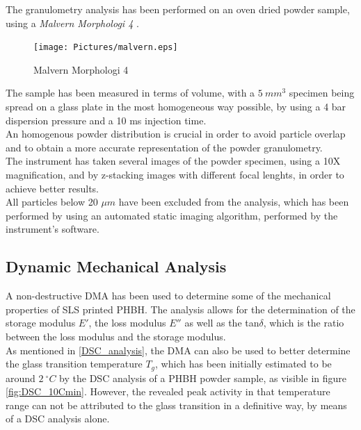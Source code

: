 \documentclass{article}
\begin{document}
        The granulometry analysis has been performed on an oven dried powder sample, 
        using a \textit{Malvern Morphologi 4} \autocites{Malvern_Morphologi4}. \\ 

        \begin{figure}[h!]
            \centering
            \texttt{[image: Pictures/malvern.eps]}
            \caption{Malvern Morphologi 4 \autocites{Malvern_Morphologi4}}
            \label{fig:morphologi4}
        \end{figure}

        The sample has been measured in terms of volume, with a $5 \ mm^3$ specimen being spread on a glass plate in the 
        most homogeneous way possible, by using a 4 bar dispersion pressure and a 10 ms injection time. \\ 

        An homogenous powder distribution is crucial in order to avoid particle overlap and to obtain a more accurate 
        representation of the powder granulometry. \\ 

        The instrument has taken several images of the powder specimen, using a 10X magnification, and by z-stacking 
        images with different focal lenghts, in order to achieve better results. \\

        All particles below 20 $\mu m$ have been excluded from the analysis, which has been performed by using an automated 
        static imaging algorithm, performed by the instrument's software. \\ 

      \clearpage

      \subsection{Dynamic Mechanical Analysis\label{DMA}}
 
        A non-destructive DMA has been used to determine some of the mechanical properties of SLS printed PHBH. The analysis 
        allows for the determination of the storage modulus $E'$, the loss modulus $E''$ as well as the tan$\delta$, 
        which is the ratio between the loss modulus and the storage modulus. \\ 
        As mentioned in \ref{DSC_analysis}, the DMA can also be used to better determine the glass transition temperature $T_g$, which 
        has been initially estimated to be around $2 \ ^{\circ}C$ by the DSC analysis of a PHBH powder sample, as visible in figure \ref{fig:DSC_10Cmin}. 
        However, the revealed 
        peak activity in that temperature range can not be attributed to the glass transition in a definitive way, by means of a DSC analysis 
        alone. \\ 
\end{document}

